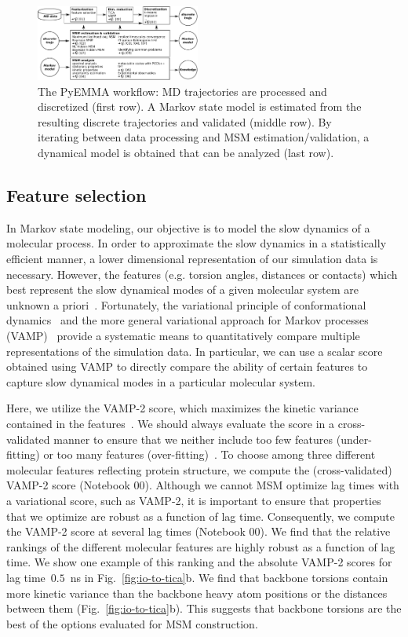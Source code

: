 \documentclass[9pt,tutorial]{livecoms}
\begin{document}
\begin{figure}[bt]
\includegraphics[width=0.48\textwidth]{figure_2}
\caption{The PyEMMA workflow: MD trajectories are processed and discretized (first row).
A Markov state model is estimated from the resulting discrete trajectories and validated (middle row).
By iterating between data processing and MSM estimation/validation,
a dynamical model is obtained that can be analyzed (last row).}
\label{fig:workflowchart}
\end{figure}

\subsection{Feature selection}

In Markov state modeling, our objective is to model the slow dynamics of a molecular process.
In order to approximate the slow dynamics in a statistically efficient manner,
a lower dimensional representation of our simulation data is necessary.
However, the features (e.g. torsion angles, distances or contacts) which best represent the slow dynamical modes of a given molecular system are unknown a priori~\cite{NoeClementiReview}.
Fortunately, the variational principle of conformational dynamics~\cite{noe-vac,nueske-vamk}
and the more general variational approach for Markov processes (VAMP)~\cite{vamp-preprint}
provide a systematic means to quantitatively compare multiple representations of the simulation data.
In particular, we can use a scalar score obtained using VAMP to directly compare the ability of certain features to capture slow dynamical modes in a particular molecular system.

Here, we utilize the VAMP-2 score, which maximizes the kinetic variance contained in the features~\cite{kinetic-maps}.
We should always evaluate the score in a cross-validated manner to ensure that we neither include too few features (under-fitting) or too many features (over-fitting)~\cite{gmrq,vamp-preprint}.
To choose among three different molecular features reflecting protein structure,
we compute the (cross-validated) VAMP-2 score (Notebook 00).
Although we cannot MSM optimize lag times with a variational score\cite{husic2017note}, such as VAMP-2,
it is important to ensure that properties that we optimize are robust as a function of lag time. 
Consequently, we compute the VAMP-2 score at several lag times (Notebook 00). 
We find that the relative rankings of the different molecular features are highly robust as a function of lag time. 
We show one example of this ranking and the absolute VAMP-2 scores for lag time~$0.5$~ns in Fig.~\ref{fig:io-to-tica}b. 
We find that backbone torsions contain more kinetic variance than the backbone heavy atom positions or the distances between them (Fig.~\ref{fig:io-to-tica}b).
This suggests that backbone torsions are the best of the options evaluated for MSM construction.
\end{document}
